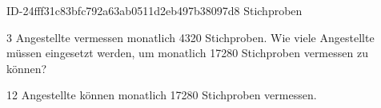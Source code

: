 \begin{exercise}
      {ID-24fff31c83bfc792a63ab0511d2eb497b38097d8}
      {Stichproben}
  \ifproblem\problem\par
    \num{3} Angestellte vermessen monatlich \num{4320} Stichproben. Wie viele Angestellte
    müssen eingesetzt werden, um monatlich \num{17280} Stichproben vermessen zu können?
  \fi
  \ifoutcome\outcome\par
    \num{12} Angestellte können monatlich \num{17280} Stichproben vermessen.
  \fi
\end{exercise}

